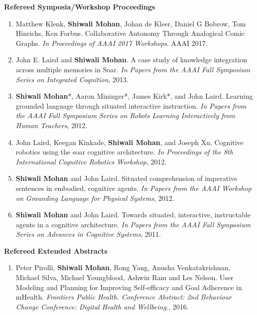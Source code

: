 \documentclass[margin,line,11pt]{res}
\begin{document}
\begin{resume}
                  \textbf{Refereed Symposia/Workshop Proceedings}
                  \begin{enumerate}[label=\lbrack W\arabic*\rbrack:,leftmargin=*]
                    \item Matthew Klenk, \textbf{Shiwali Mohan}, Johan de Kleer, Daniel G Bobrow, Tom Hinrichs, Ken Forbus. Collaborative Autonomy Through Analogical Comic Graphs. \emph{In Proceedings of AAAI 2017 Workshops}. AAAI 2017.
                  \item John E. Laird and \textbf{Shiwali Mohan}. A case study of knowledge integration across multiple memories in
                    Soar. \emph{In Papers from the AAAI Fall Symposium Series on Integrated Cognition}, 2013.
                  \item \textbf{Shiwali Mohan}*, Aaron Mininger*, James Kirk*, and John Laird. Learning grounded language through
                    situated interactive instruction. \emph{In Papers from the AAAI Fall Symposium Series on Robots Learning Interactively from Human Teachers}, 2012.
                  \item John Laird, Keegan Kinkade, \textbf{Shiwali Mohan}, and Joseph Xu. Cognitive robotics using the soar cognitive
                    architecture. \emph{In Proceedings of the 8th International Cognitive Robotics Workshop}, 2012.
                  \item \textbf{Shiwali Mohan} and John Laird. Situated comprehension of imperative sentences in embodied, cognitive
                    agents. \emph{In Papers from the AAAI Workshop on Grounding Language for Physical Systems}, 2012.
                  \item \textbf{Shiwali Mohan} and John Laird. Towards situated, interactive, instructable agents in a cognitive architecture. \emph{In Papers from the AAAI Fall Symposium Series on Advances in Cognitive Systems}, 2011.
                  \end{enumerate}


                  \textbf{Refereed Extended Abstracts}
                  \begin{enumerate}[label=\lbrack A\arabic*\rbrack,leftmargin=*]

                  \item Peter Pirolli, \textbf{Shiwali Mohan}, Rong Yang, Anusha Venkatakrishnan, Michael Silva, Michael Youngblood, Ashwin Ram and Les Nelson. User Modeling and Planning for Improving Self-efficacy and Goal Adherence in mHealth. \emph{Frontiers Public Health. Conference Abstract: 2nd Behaviour Change Conference: Digital Health and Wellbeing.}, 2016.
                    

\end{enumerate}
\end{resume}
\end{document}
